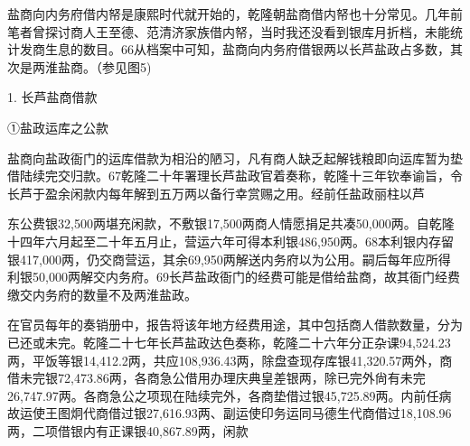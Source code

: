 



盐商向内务府借内帑是康熙时代就开始的，乾隆朝盐商借内帑也十分常见。几年前笔者曾探讨商人王至德、范清济家族借内帑，当时我还没看到银库月折档，未能统计发商生息的数目。66从档案中可知，盐商向内务府借银两以长芦盐政占多数，其次是两淮盐商。（参见图5)

1. 长芦盐商借款

①盐政运库之公款

盐商向盐政衙门的运库借款为相沿的陋习，凡有商人缺乏起解钱粮即向运库暂为垫借陆续完交归款。67乾隆二十年署理长芦盐政官着奏称，乾隆十三年钦奉谕旨，令长芦于盈余闲款内每年解到五万两以备行幸赏赐之用。经前任盐政丽柱以芦

\vfill
\begin{BookNotes}
\end{BookNotes}



\noindent 东公费银32,500两堪充闲款，不敷银17,500两商人情愿捐足共凑50,000两。自乾隆十四年六月起至二十年五月止，营运六年可得本利银486,950两。68本利银内存留银417,000两，仍交商营运，其余69,950两解送内务府以为公用。嗣后每年应所得利银50,000两解交内务府。69长芦盐政衙门的经费可能是借给盐商，故其衙门经费缴交内务府的数量不及两淮盐政。

在官员每年的奏销册中，报告将该年地方经费用途，其中包括商人借款数量，分为已还或未完。乾隆二十七年长芦盐政达色奏称，乾隆二十六年分正杂课94,524.23两，平饭等银14,412.2两，共应108,936.43两，除盘查现存库银41,320.57两外，商借未完银72,473.86两，各商急公借用办理庆典皇差银两，除已完外尙有未完26,747.97两。各商急公之项现在陆续完外，各商垫借过银45,725.89两。内前任病故运使王图炯代商借过银27,616.93两、副运使印务运同马德生代商借过18,108.96两，二项借银内有正课银40,867.89两，闲款

